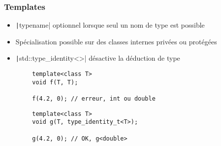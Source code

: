 \documentclass[C++.tex]{subfiles}
\begin{document}
\begin{frame}[fragile]
	\frametitle{Templates}
	\begin{itemize}
		\item \texttt|typename| optionnel lorsque seul un nom de type est possible


		\item Spécialisation possible sur des classes internes privées ou protégées
		\item \texttt|std::type_identity<>| désactive la déduction de type
	\end{itemize}

	\begin{verbatim}
		template<class T>
		void f(T, T);

		f(4.2, 0); // erreur, int ou double
	\end{verbatim}

	\begin{verbatim}
		template<class T>
		void g(T, type_identity_t<T>);

		g(4.2, 0); // OK, g<double>
	\end{verbatim}


\end{frame}
\end{document}
